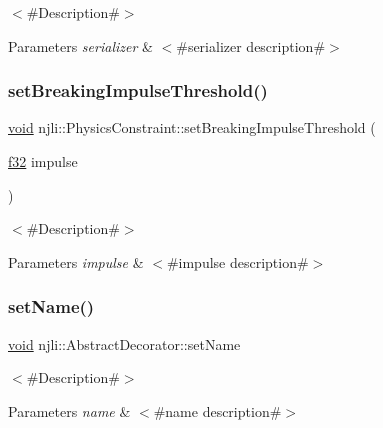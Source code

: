 $<$\#\+Description\#$>$


\begin{DoxyParams}{Parameters}
{\em serializer} & $<$\#serializer description\#$>$ \\
\hline
\end{DoxyParams}
\mbox{\label{classnjli_1_1_physics_constraint_aff159cbeea66d0f2598172e7cecf2269}} 
\subsubsection{\texorpdfstring{set\+Breaking\+Impulse\+Threshold()}{setBreakingImpulseThreshold()}}
{\footnotesize\ttfamily \mbox{\hyperlink{_thread_8h_af1e856da2e658414cb2456cb6f7ebc66}{void}} njli\+::\+Physics\+Constraint\+::set\+Breaking\+Impulse\+Threshold (\begin{DoxyParamCaption}\item[{\mbox{\hyperlink{_util_8h_a5f6906312a689f27d70e9d086649d3fd}{f32}}}]{impulse }\end{DoxyParamCaption})}

$<$\#\+Description\#$>$


\begin{DoxyParams}{Parameters}
{\em impulse} & $<$\#impulse description\#$>$ \\
\hline
\end{DoxyParams}
\mbox{\label{classnjli_1_1_physics_constraint_a087eb5f8d9f51cc476f12f1d10a3cb95}} 
\subsubsection{\texorpdfstring{set\+Name()}{setName()}}
{\footnotesize\ttfamily \mbox{\hyperlink{_thread_8h_af1e856da2e658414cb2456cb6f7ebc66}{void}} njli\+::\+Abstract\+Decorator\+::set\+Name}

$<$\#\+Description\#$>$


\begin{DoxyParams}{Parameters}
{\em name} & $<$\#name description\#$>$ \\
\hline
\end{DoxyParams}
\mbox{\label{classnjli_1_1_physics_constraint_a213a1a155d46a52ef237cb4ed82a8607}} 
